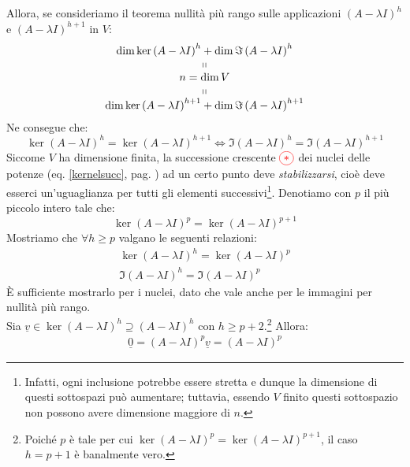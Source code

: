 \begin{demonstration}
\begin{enumerate}[label=\Roman*]
Allora, se consideriamo il teorema nullità più rango sulle applicazioni $\left(A-\lambda I\right)^h$ e $\left(A-\lambda I\right)^{h+1}$ in $V$:
\begin{equation*}
		\begin{array}{c}
			\dim \ker \left(A-\lambda I\right)^h + \dim \Im\left(A-\lambda I\right)^{h}\\
			\shortparallel\\
			n=\dim V\\
			\shortparallel\\
			\dim \ker \left(A-\lambda I\right)^{h+1} + \dim \Im\left(A-\lambda I\right)^{h+1}
	\end{array}
\end{equation*}
Ne consegue che:
\begin{equation}
	\ker \left(A-\lambda I\right)^h=\ker \left(A-\lambda I\right)^{h+1}\iff \Im\left(A-\lambda I\right)^{h}=\Im\left(A-\lambda I\right)^{h+1}
\end{equation}
Siccome $V$ ha dimensione finita, la successione crescente $\textcolor{red}{\circled{\ast}}$ dei nuclei delle potenze (eq. \ref{kernelsucc}, pag. \pageref{kernelsucc}) ad un certo punto deve \textit{stabilizzarsi}, cioè deve esserci un'uguaglianza per tutti gli elementi successivi\footnote{Infatti, ogni inclusione potrebbe essere stretta e dunque la dimensione di questi sottospazi può aumentare; tuttavia, essendo $V$ finito questi sottospazio non possono avere dimensione maggiore di $n$.}. Denotiamo con $p$ il più piccolo intero tale che:
\begin{equation*}
	\ker \left(A-\lambda I\right)^p=\ker \left(A-\lambda I\right)^{p+1}
\end{equation*}
Mostriamo che $\forall h\geq p$ valgano le seguenti relazioni:
\begin{gather*}
	\ker \left(A-\lambda I\right)^h= \ker \left(A-\lambda I\right)^p\\
	\Im\left(A-\lambda I\right)^h=\Im\left(A-\lambda I\right)^p
\end{gather*}
È sufficiente mostrarlo per i nuclei, dato che vale anche per le immagini per nullità più rango.\\
Sia $\underline{v}\in\ker \left(A-\lambda I\right)^h\supseteq \left(A-\lambda I\right)^h$ con $h\geq p+2$.\footnote{Poiché $p$ è tale per cui $\ker \left(A-\lambda I\right)^p=\ker \left(A-\lambda I\right)^{p+1}$, il caso $h=p+1$ è banalmente vero.} Allora:
\begin{equation*}
\begin{array}{l}
\underline{0}=\left(A-\lambda I\right)^p\underline{v}=\left(A-\lambda I\right)^{p
}
\end{array}
\end{equation*}
\end{enumerate}
\end{demonstration}
